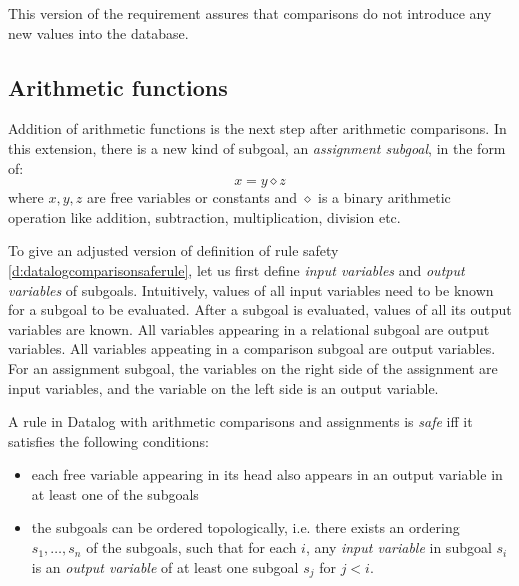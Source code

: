 This version of the requirement assures that comparisons do not introduce any new values into the database.

\subsection{Arithmetic functions}

Addition of arithmetic functions is the next step after arithmetic comparisons. In this extension, there is a new kind of subgoal, an \emph{assignment subgoal}, in the form of:
$$x = y \diamond z$$
where $x, y, z$ are free variables or constants and $\diamond$ is a binary arithmetic operation like addition, subtraction, multiplication, division etc.

To give an adjusted version of definition of rule safety \ref{d:datalogcomparisonsaferule}, let us first define \emph{input variables} and \emph{output variables} of subgoals. Intuitively, values of all input variables need to be known for a subgoal to be evaluated. After a subgoal is evaluated, values of all its output variables are known. All variables appearing in a relational subgoal are output variables. All variables appeating in a comparison subgoal are output variables. For an assignment subgoal, the variables on the right side of the assignment are input variables, and the variable on the left side is an output variable.

\begin{defn}\label{d:datalogeqsaferule}
A rule in Datalog with arithmetic comparisons and assignments is \emph{safe} iff it satisfies the following conditions:
\begin{itemize}
\item each free variable appearing in its head also appears in an output variable in at least one of the subgoals
\item the subgoals can be ordered topologically, i.e. there exists an ordering $s_1, \dots, s_n$ of the subgoals, such that for each $i$, any \emph{input variable} in subgoal $s_i$ is an \emph{output variable} of at least one subgoal $s_j$ for $j < i$. 
\end{itemize}
\end{defn}


